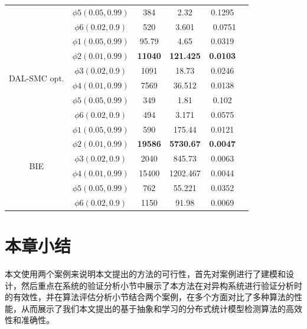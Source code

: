 \begin{table}
\begin{tabular}{c c c c c c}
                & $\phi5(0.05,0.99)$ &  384&  2.32&  0.1295\\ 
                & $\phi6(0.02,0.9)$ &  520& 3.601& \ 0.0751\\      
        \hline 
         \multirow{6}{1.5cm}{DAL-SMC opt.}  
                & $\phi1(0.05,0.99)$ &  95.79&  4.65&  0.0319\\ 
                & $\phi2(0.01,0.99)$ &  \textbf{11040}&  \textbf{121.425} &  \textbf{0.0103}\\ 
                & $\phi3(0.02,0.9)$ &  1091& 18.73& 0.0246\\ 
                & $\phi4(0.01,0.99)$ &  7569&  36.512 &  0.0138\\ 
                & $\phi5(0.05,0.99)$ &  349&  1.81&  0.102\\ 
                & $\phi6(0.02,0.9)$ &  494& 3.171& 0.0575\\     
        \hline 
         \multirow{6}{1.5cm}{BIE}  
                & $\phi1(0.05,0.99)$ &  590&  175.44&  0.0121\\ 
                & $\phi2(0.01,0.99)$ &  \textbf{19586}&  \textbf{5730.67} &  \textbf{0.0047} \\ 
                & $\phi3(0.02,0.9)$ &  2040& 845.73& 0.0063\\ 
                & $\phi4(0.01,0.99)$ & 15400&  1202.467 &  0.0044\\ 
                & $\phi5(0.05,0.99)$ &  762&  55.221&  0.0352\\ 
                & $\phi6(0.02,0.9)$ &  1150& 91.98& 0.0069\\      
        \hline 
\end{tabular} 
\label{ta-rs}
\end{table}

\section{本章小结}
本文使用两个案例来说明本文提出的方法的可行性，首先对案例进行了建模和设计，然后重点在系统的验证分析小节中展示了本方法在对异构系统进行验证分析时的有效性，并在算法评估分析小节结合两个案例，在多个方面对比了多种算法的性能，从而展示了我们本文提出的基于抽象和学习的分布式统计模型检测算法的高效性和准确性。
